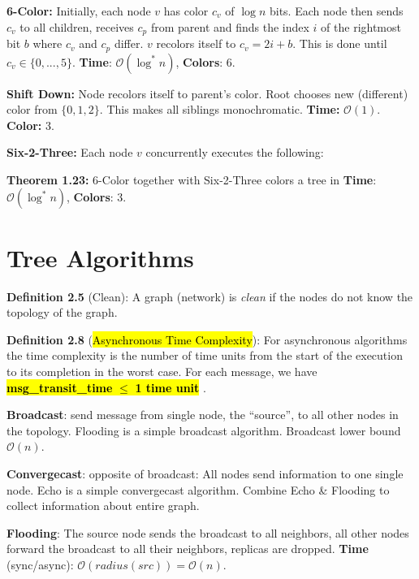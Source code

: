 \documentclass[a4paper, 8pt, landscape]{scrartcl}
\begin{document}
\begin{multicols*}{3}
\textbf{6-Color:} Initially, each node $v$ has color $c_v$ of $\log n$ bits. Each node then sends $c_v$ to all children, receives $c_p$ from parent and finds the index $i$ of the rightmost bit $b$ where $c_v$ and $c_p$ differ. $v$ recolors itself to $c_v = 2i + b$. This is done until $c_v \in \{0,...,5\}$. \textbf{Time}: $\mathcal{O}(\log^* n)$, \textbf{Colors}: 6.

\textbf{Shift Down:} Node recolors itself to parent's color. Root chooses new (different) color from $\{0,1,2\}$. This makes all siblings monochromatic. \textbf{Time:} $\mathcal{O}(1)$. \textbf{Color:} 3.

\textbf{Six-2-Three:} Each node $v$ concurrently executes the following:\\
{
\setlength{\interspacetitleruled}{0pt}%
\setlength{\algotitleheightrule}{0pt}%
\begin{algorithm}[H]
	\SetAlgoLined
\end{algorithm}
}

\textbf{Theorem 1.23:} 6-Color together with Six-2-Three colors a tree in \textbf{Time}: $\mathcal{O}(\log^* n)$, \textbf{Colors}: 3.

\section{Tree Algorithms}

\textbf{Definition 2.5} (Clean): A graph (network) is \textit{clean} if the nodes do not know the topology of the graph.

\textbf{Definition 2.8} (\hl{Asynchronous Time Complexity}): For asynchronous algorithms the time complexity is the number of time units from the
start of the execution to its completion in the worst case. For each message, we have \hl{\textbf{msg\_transit\_time } $\leq$ \textbf{ 1 time unit }}.

\textbf{Broadcast}: send message from single node, the “source”, to all other nodes in the topology. Flooding is a simple broadcast algorithm. Broadcast lower bound $\mathcal{O}(n)$.

\textbf{Convergecast}: opposite of broadcast: All nodes send information to one single node. Echo is a simple convergecast algorithm. Combine Echo \& Flooding to collect information about entire graph.

\textbf{Flooding}: The source node sends the broadcast to all neighbors, all other nodes forward the broadcast to all their neighbors, replicas are dropped. \textbf{Time} (sync/async): $\mathcal{O}(radius(src)) = \mathcal{O}(n)$.


\end{multicols*}
\end{document}
